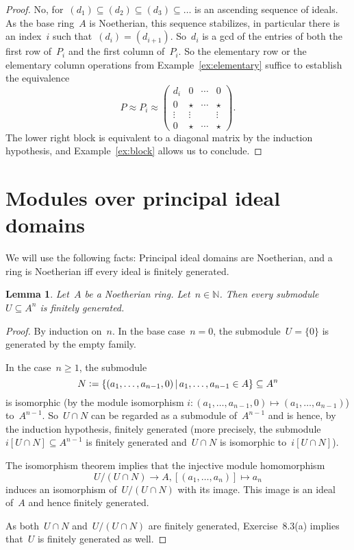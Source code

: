 \documentclass[12pt]{scrartcl}
\theoremstyle{definition}
\theoremstyle{plain}
\newtheorem{lemma}[definition]{Lemma}
\theoremstyle{remark}
\newcommand{\defeq}{\vcentcolon=}
\begin{document}
\begin{proof}
No, for~$(d_1) \subseteq (d_2) \subseteq (d_3) \subseteq \ldots$ is an ascending sequence of ideals. As the base ring~$A$ is Noetherian, this sequence stabilizes, in particular there is an index~$i$ such that~$(d_i) = (d_{i+1})$. So~$d_i$ is a gcd of the entries of both the first row of~$P_i$ and the first column of~$P_i$. So the elementary row or the elementary column operations from Example~\ref{ex:elementary} suffice to establish the equivalence
\[ P \approx P_i \approx \begin{pmatrix}d_i&0&\cdots&0\\0&\star&\cdots&\star\\\vdots&\vdots&&\vdots\\0&\star&\cdots&\star\end{pmatrix}\!.
\]
The lower right block is equivalent to a diagonal matrix by the induction hypothesis, and Example~\ref{ex:block} allows us to conclude.
\end{proof}


\section{Modules over principal ideal domains}

We will use the following facts: Principal ideal domains are Noetherian, and a ring is Noetherian iff every ideal is finitely generated.

\begin{lemma}
    Let~$A$ be a Noetherian ring. Let~$n \in \mathbb{N}$. Then every submodule~$U \subseteq A^n$ is finitely generated.
\end{lemma}

\begin{proof}
    By induction on~$n$. In the base case~$n = 0$, the submodule~$U = \{0\}$ is generated by the empty family.

    In the case~$n \geq 1$, the submodule
    \[ N \defeq \{ (a_1,\ldots,a_{n-1},0) \,|\, a_1,\ldots,a_{n-1} \in A \} \subseteq A^n \]
    is isomorphic (by the module isomorphism
    $i : (a_1,\ldots,a_{n-1},0) \mapsto (a_1,\ldots,a_{n-1})$) to~$A^{n-1}$. So~$U \cap N$ can be regarded as a submodule of~$A^{n-1}$ and is hence, by the induction hypothesis, finitely generated (more precisely,
    the submodule~$i[U \cap N] \subseteq A^{n-1}$
    is finitely generated and~$U \cap N$ is isomorphic to~$i[U \cap N]$).

    The isomorphism theorem implies that
    the injective module homomorphism
    \[ U/(U \cap N) \longrightarrow A,
    [(a_1,\ldots,a_n)] \longmapsto a_n \]
    induces an isomorphism of~$U/(U \cap N)$
    with its image. This image is an ideal of~$A$ and hence finitely generated.

    As both~$U \cap N$ and~$U/(U \cap N)$ are finitely generated, Exercise~8.3(a) implies that~$U$ is finitely generated as well.
\end{proof}
\end{document}
